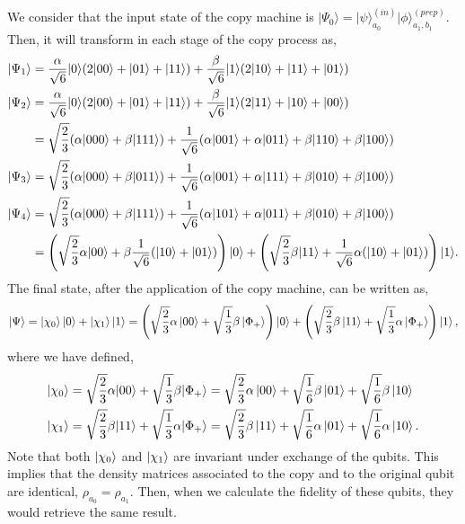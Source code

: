 We consider that the input state of the copy machine is $|\Psi_0\rangle = |\psi\rangle^{(in)}_{a_0}|\phi\rangle^{(prep)}_{a_1,b_1}$. Then, it will transform in each stage of the copy process as,
\begin{align}
|\Psi_1\rangle &= \frac{\alpha}{\sqrt{6}}|0\rangle(2|00\rangle +|01\rangle + |11\rangle) + \frac{\beta}{\sqrt{6}}|1\rangle(2|10\rangle +|11\rangle + |01\rangle)\notag \\
|\Psi_2\rangle &= \frac{\alpha}{\sqrt{6}}|0\rangle(2|00\rangle +|01\rangle + |11\rangle) + \frac{\beta}{\sqrt{6}}|1\rangle(2|11\rangle +|10\rangle + |00\rangle)\notag \\
&= \sqrt{\frac{2}{3}}(\alpha|000\rangle+\beta|111\rangle) + \frac{1}{\sqrt{6}}(\alpha|001\rangle +\alpha|011\rangle + \beta|110\rangle + \beta |100\rangle)\notag \\
|\Psi_3\rangle &= \sqrt{\frac{2}{3}}(\alpha|000\rangle+\beta|011\rangle) + \frac{1}{\sqrt{6}}(\alpha|001\rangle +\alpha|111\rangle + \beta|010\rangle + \beta |100\rangle)\notag \\
|\Psi_4\rangle &= \sqrt{\frac{2}{3}}(\alpha|000\rangle+\beta|111\rangle) + \frac{1}{\sqrt{6}}(\alpha|101\rangle +\alpha|011\rangle + \beta|010\rangle + \beta |100\rangle)\notag \\
&=\left( \sqrt{\frac{2}{3}}\alpha|00\rangle +\beta \frac{1}{\sqrt{6}}(|10\rangle+|01\rangle)\right)|0\rangle  + \left( \sqrt{\frac{2}{3}}\beta|11\rangle + \frac{1}{\sqrt{6}}\alpha(|10\rangle + |01\rangle )\right)|1\rangle.\notag
\end{align}
The final state, after the application of the copy machine, can be written as,
\begin{equation}
\ket{\Psi}=\ket{\chi_0}\ket{0}+\ket{\chi_1}\ket{1}=\left(\sqrt{\frac{2}{3}}\alpha\ket{00}+\sqrt{\frac{1}{3}}\beta\ket{\Phi_+}\right)\ket{0}+\left(\sqrt{\frac{2}{3}}\beta\ket{11}+\sqrt{\frac{1}{3}}\alpha\ket{\Phi_+}\right)\ket{1},
\end{equation}
where we have defined,
\begin{align}
|\chi_0\rangle &= \sqrt{\frac{2}{3}}\alpha|00\rangle + \sqrt{\frac{1}{3}}\beta|\Phi_+\rangle=\sqrt{\frac{2}{3}}\alpha\ket{00}+\sqrt{\frac{1}{6}}\beta\ket{01}+\sqrt{\frac{1}{6}}\beta\ket{10}\\
|\chi_1\rangle &= \sqrt{\frac{2}{3}}\beta|11\rangle +\sqrt{\frac{1}{3}}\alpha |\Phi_+\rangle=\sqrt{\frac{2}{3}}\beta\ket{11}+\sqrt{\frac{1}{6}}\alpha\ket{01}+\sqrt{\frac{1}{6}}\alpha\ket{10}.
\end{align}
Note that both $\ket{\chi_0}$ and $\ket{\chi_1}$ are invariant under exchange of the qubits. This implies that the density matrices associated to the copy and to the original qubit are identical, $\rho_{a_0}=\rho_{a_1}$. Then, when we calculate the fidelity of these qubits, they would retrieve the same result.

